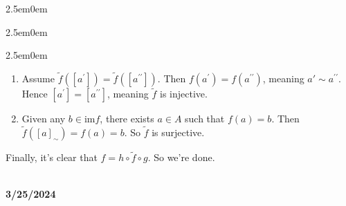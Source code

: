 \documentclass{book}
\newenvironment{myIndent}{%
   \begin{adjustwidth}{2.5em}{0em}%
}{%
   \end{adjustwidth}%
}
\newcommand*{\markDate}[1]{%
   {\huge \color{Black} \textbf{#1} \newline}%
}
\newcommand{\pprime}{{\prime\prime}}
\newcommand{\myIm}{\mathrm{im}}
\newcommand{\mySepTwo}[1][.]{%
   {\noindent\color{#1}{\rule{6.5in}{0.5mm}}}\\%
}
\newcommand{\retTwo}{\hfill\bigbreak}
\begin{document}
{\begin{myIndent}
{\begin{myIndent}
{\begin{myIndent}
\begin{enumerate}
               \newpage

               \item Assume $\widetilde{f}([a^\prime]) = \widetilde{f}([a^\pprime])$. Then $f(a^\prime) = f(a^\pprime)$, meaning $a' \sim a^\pprime$.\\ Hence $[a^\prime] = [a^\pprime]$, meaning  $\widetilde{f}$ is injective.\\
               
               \item Given any $b \in \myIm f$, there exists $a \in A$ such that $f(a) = b$. Then\\ $\widetilde{f}([a]_\sim) = f(a) = b$. So $\widetilde{f}$ is surjective.\retTwo
            \end{enumerate}
         \end{myIndent}}

         Finally, it's clear that $f = h \circ \widetilde{f} \circ g$. So we're done.
      \end{myIndent}}
   \end{myIndent}}

   \mySepTwo

   \markDate{3/25/2024}
\end{document}
